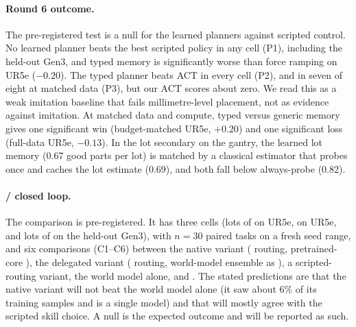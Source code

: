 \paragraph{Round 6 outcome.} The pre-registered test is a null for the learned planners against scripted control.
No learned planner beats the best scripted policy in any cell (P1), including the held-out Gen3, and typed memory
is significantly worse than force ramping on UR5e  ($-0.20$). The typed planner beats ACT in
every cell (P2), and in seven of eight at matched data (P3), but our ACT scores about zero. We read this as a weak
imitation baseline that fails millimetre-level placement, not as evidence against imitation. At matched data and
compute, typed versus generic memory gives one significant win (budget-matched  UR5e, $+0.20$)
and one significant loss (full-data  UR5e, $-0.13$). In the lot secondary on the gantry, the
learned lot memory (0.67 good parts per lot) is matched by a classical estimator that probes once and caches the
lot estimate (0.69), and both fall below always-probe \pta{} (0.82). 



\paragraph{\sysI/\sysII{} closed loop.}
The comparison is pre-registered. It has three cells (lots of  on UR5e,
 on UR5e, and lots of  on the held-out Gen3), with $n = 30$ paired tasks
on a fresh seed range, and six comparisons
(C1--C6) between the native variant (\sysII{} routing, pretrained-core \sysI), the delegated variant
(\sysII{} routing, world-model ensemble as \sysI), a scripted-routing variant, the world model alone, and
\pta. The stated predictions are that the native variant will not beat the world model alone (it saw about 6\%
of its training samples and is a single model) and that \sysII{} will mostly agree with the scripted skill
choice. A null is the expected outcome and will be reported as such.

